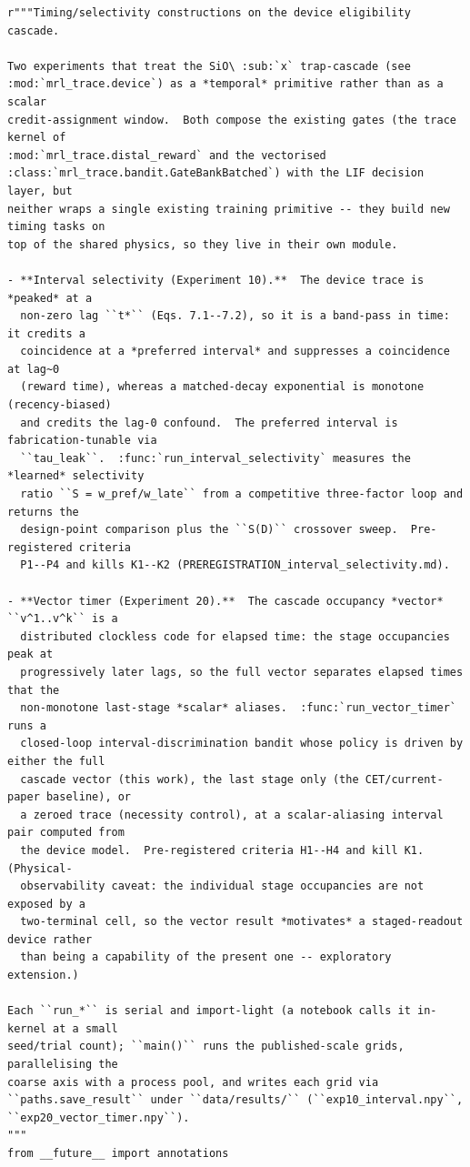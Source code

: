 \begin{lstlisting}[caption={mrl\_trace/selectivity.py},label={lst:siox-src-selectivity}]
r"""Timing/selectivity constructions on the device eligibility cascade.

Two experiments that treat the SiO\ :sub:`x` trap-cascade (see
:mod:`mrl_trace.device`) as a *temporal* primitive rather than as a scalar
credit-assignment window.  Both compose the existing gates (the trace kernel of
:mod:`mrl_trace.distal_reward` and the vectorised
:class:`mrl_trace.bandit.GateBankBatched`) with the LIF decision layer, but
neither wraps a single existing training primitive -- they build new timing tasks on
top of the shared physics, so they live in their own module.

- **Interval selectivity (Experiment 10).**  The device trace is *peaked* at a
  non-zero lag ``t*`` (Eqs. 7.1--7.2), so it is a band-pass in time: it credits a
  coincidence at a *preferred interval* and suppresses a coincidence at lag~0
  (reward time), whereas a matched-decay exponential is monotone (recency-biased)
  and credits the lag-0 confound.  The preferred interval is fabrication-tunable via
  ``tau_leak``.  :func:`run_interval_selectivity` measures the *learned* selectivity
  ratio ``S = w_pref/w_late`` from a competitive three-factor loop and returns the
  design-point comparison plus the ``S(D)`` crossover sweep.  Pre-registered criteria
  P1--P4 and kills K1--K2 (PREREGISTRATION_interval_selectivity.md).

- **Vector timer (Experiment 20).**  The cascade occupancy *vector* ``v^1..v^k`` is a
  distributed clockless code for elapsed time: the stage occupancies peak at
  progressively later lags, so the full vector separates elapsed times that the
  non-monotone last-stage *scalar* aliases.  :func:`run_vector_timer` runs a
  closed-loop interval-discrimination bandit whose policy is driven by either the full
  cascade vector (this work), the last stage only (the CET/current-paper baseline), or
  a zeroed trace (necessity control), at a scalar-aliasing interval pair computed from
  the device model.  Pre-registered criteria H1--H4 and kill K1.  (Physical-
  observability caveat: the individual stage occupancies are not exposed by a
  two-terminal cell, so the vector result *motivates* a staged-readout device rather
  than being a capability of the present one -- exploratory extension.)

Each ``run_*`` is serial and import-light (a notebook calls it in-kernel at a small
seed/trial count); ``main()`` runs the published-scale grids, parallelising the
coarse axis with a process pool, and writes each grid via
``paths.save_result`` under ``data/results/`` (``exp10_interval.npy``,
``exp20_vector_timer.npy``).
"""
from __future__ import annotations


\end{lstlisting}
